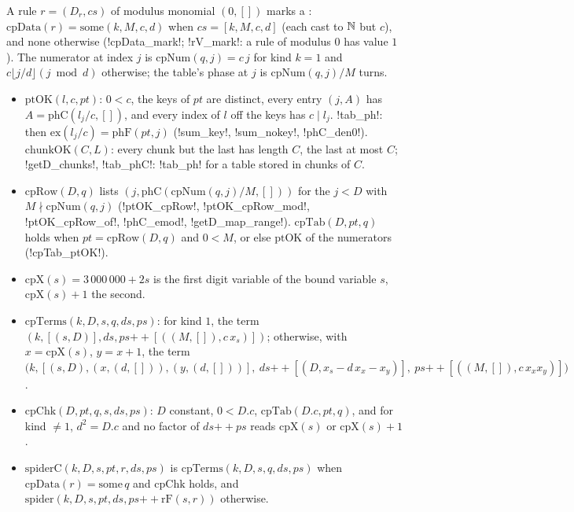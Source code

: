 \begin{definition}\label{def:lean-sym-compact}
A rule $r=(D_r,cs)$ of modulus monomial $(0,[])$ marks a : $\mathrm{cpData}(r)=\mathrm{some}(k,M,c,d)$ when $cs=[k,M,c,d]$ (each cast to $\mathbb{N}$ but $c$), and $\mathrm{none}$ otherwise (\lean!cpData_mark!; \lean!rV_mark!: a rule of modulus $0$ has value $1$). The numerator at index $j$ is $\mathrm{cpNum}(q,j)=c\,j$ for kind $k=1$ and $c\lfloor j/d\rfloor(j\bmod d)$ otherwise; the table's phase at $j$ is $\mathrm{cpNum}(q,j)/M$ turns.
\begin{itemize}
\item $\mathrm{ptOK}(l,c,\mathit{pt})$: $0<c$, the keys of $\mathit{pt}$ are distinct, every entry $(j,A)$ has $A=\mathrm{phC}(l_j/c,[])$, and every index of $l$ off the keys has $c\mid l_j$. \lean!tab_ph!: then $\mathrm{ex}(l_j/c)=\mathrm{phF}(\mathit{pt},j)$ (\lean!sum_key!, \lean!sum_nokey!, \lean!phC_den0!). $\mathrm{chunkOK}(C,L)$: every chunk but the last has length $C$, the last at most $C$; \lean!getD_chunks!, \lean!tab_phC!: \lean!tab_ph! for a table stored in chunks of $C$.
\item \begin{sloppypar}$\mathrm{cpRow}(D,q)$ lists $(j,\mathrm{phC}(\mathrm{cpNum}(q,j)/M,[]))$ for the $j<D$ with $M\nmid\mathrm{cpNum}(q,j)$ (\lean!ptOK_cpRow!, \lean!ptOK_cpRow_mod!, \lean!ptOK_cpRow_of!, \lean!phC_emod!, \lean!getD_map_range!). $\mathrm{cpTab}(D,\mathit{pt},q)$ holds when $\mathit{pt}=\mathrm{cpRow}(D,q)$ and $0<M$, or else $\mathrm{ptOK}$ of the numerators (\lean!cpTab_ptOK!).\end{sloppypar}
\item $\mathrm{cpX}(s)=3\,000\,000+2s$ is the first digit variable of the bound variable $s$, $\mathrm{cpX}(s)+1$ the second.
\item $\mathrm{cpTerms}(k,D,s,q,ds,ps)$: for kind $1$, the term $(k,[(s,D)],ds,ps\mathbin{+\!\!+}[((M,[]),c\,x_s)])$; otherwise, with $x=\mathrm{cpX}(s)$, $y=x+1$, the term $\bigl(k,[(s,D),(x,(d,[])),(y,(d,[]))],\ ds\mathbin{+\!\!+}[(D,x_s-d\,x_x-x_y)],\ ps\mathbin{+\!\!+}[((M,[]),c\,x_xx_y)]\bigr)$.
\item $\mathrm{cpChk}(D,\mathit{pt},q,s,ds,ps)$: $D$ constant, $0<D.c$, $\mathrm{cpTab}(D.c,\mathit{pt},q)$, and for kind $\ne1$, $d^2=D.c$ and no factor of $ds\mathbin{+\!\!+}ps$ reads $\mathrm{cpX}(s)$ or $\mathrm{cpX}(s)+1$.
\item $\mathrm{spiderC}(k,D,s,\mathit{pt},r,ds,ps)$ is $\mathrm{cpTerms}(k,D,s,q,ds,ps)$ when $\mathrm{cpData}(r)=\mathrm{some}\,q$ and $\mathrm{cpChk}$ holds, and $\mathrm{spider}(k,D,s,\mathit{pt},ds,ps\mathbin{+\!\!+}\mathrm{rF}(s,r))$ otherwise.

\end{itemize}
\end{definition}

